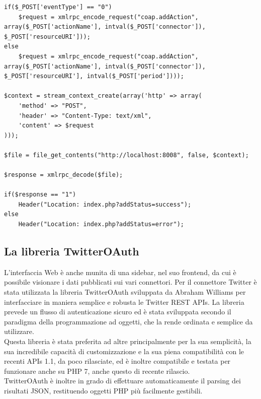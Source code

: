 \lstset{title=Il codice PHP che serializza la chiamata RPC su XML e la deserializza per leggere il valore di ritorno, language=PHP}
\begin{lstlisting}[float]
if($_POST['eventType'] == "0")
	$request = xmlrpc_encode_request("coap.addAction", array($_POST['actionName'], intval($_POST['connector']), $_POST['resourceURI']));
else
	$request = xmlrpc_encode_request("coap.addAction", array($_POST['actionName'], intval($_POST['connector']), $_POST['resourceURI'], intval($_POST['period'])));
	
$context = stream_context_create(array('http' => array(
    'method' => "POST",
    'header' => "Content-Type: text/xml",
    'content' => $request
)));

$file = file_get_contents("http://localhost:8008", false, $context);

$response = xmlrpc_decode($file);

if($response == "1")
	Header("Location: index.php?addStatus=success");
else
	Header("Location: index.php?addStatus=error");
\end{lstlisting}

\subsection{La libreria TwitterOAuth}
L'interfaccia Web è anche munita di una sidebar, nel suo frontend, da cui è possibile visionare i dati pubblicati sui vari connettori. Per il connettore Twitter è stata utilizzata la libreria TwitterOAuth sviluppata da Abraham Williams per interfacciare in maniera semplice e robusta le Twitter REST APIs. La libreria prevede un flusso di autenticazione sicuro ed è stata sviluppata secondo il paradigma della programmazione ad oggetti, che la rende ordinata e semplice da utilizzare.
\\Questa libreria è stata preferita ad altre principalmente per la sua semplicità, la sua incredibile capacità di customizzazione e la sua piena compatibilità con le recenti APIs 1.1, da poco rilasciate, ed è inoltre compatibile e testata per funzionare anche su PHP 7, anche questo di recente rilascio.
\\TwitterOAuth è inoltre in grado di effettuare automaticamente il parsing dei risultati JSON, restituendo oggetti PHP più facilmente gestibili.

